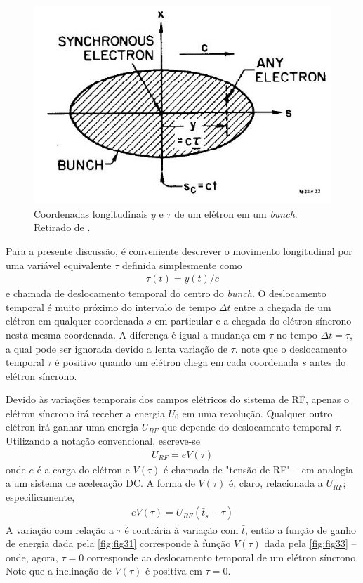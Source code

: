 \begin{figure}[!htb]
	\centering
	\includegraphics[width=0.6\linewidth]{./Figuras/fig32.jpeg}
	\caption{Coordenadas longitudinais $y$ e $\tau$ de um elétron em um \textit{bunch}. Retirado de \cite{sands1970physics}.}
	\label{fig:fig32}
\end{figure}

Para a presente discussão, é conveniente descrever o movimento longitudinal por uma variável equivalente $\tau$ definida simplesmente como
\begin{align}
	\tau(t) = y(t)/c
\end{align}
e chamada de deslocamento temporal do centro do \textit{bunch}. O deslocamento temporal é muito próximo do intervalo de tempo $\Delta t$ entre a chegada de um elétron em qualquer coordenada $s$ em particular e a chegada do elétron síncrono nesta mesma coordenada. A diferença é igual a mudança em $\tau$ no tempo $\Delta t = \tau$, a qual pode ser ignorada devido a lenta variação de $\tau$. note que o deslocamento temporal $\tau$ é positivo quando um elétron chega em cada coordenada $s$ antes do elétron síncrono.

Devido às variações temporais dos campos elétricos do sistema de RF, apenas o elétron síncrono irá receber a energia $U_0$ em uma revolução. Qualquer outro elétron irá ganhar uma energia $U_{RF}$ que depende do deslocamento temporal $\tau$. Utilizando a notação convencional, escreve-se
\begin{align}
	U_{RF} = eV(\tau)
\end{align}
onde $e$ é a carga do elétron e $V(\tau)$ é chamada de "tensão de RF" -- em analogia a um sistema de aceleração DC. A forma de $V(\tau)$ é, claro, relacionada a $U_{RF}$; especificamente,
\begin{align}
	eV(\tau) = U_{RF}(\bar{t}_s - \tau)
\end{align}
A variação com relação a $\tau$ é contrária à variação com $\bar{t}$, então a função de ganho de energia dada pela \autoref{fig:fig31} corresponde à função $V(\tau)$ dada pela \autoref{fig:fig33} -- onde, agora, $\tau=0$ corresponde ao deslocamento temporal de um elétron síncrono. Note que a inclinação de $V(\tau)$ é positiva em $\tau=0$.

